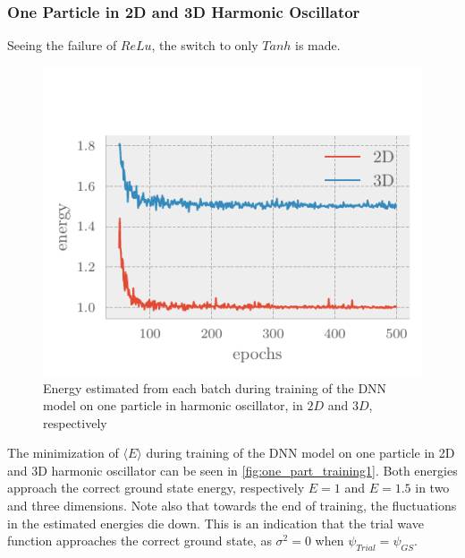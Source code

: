 \subsubsection{One Particle in 2D and 3D Harmonic Oscillator}

Seeing the failure of $ReLu$, the switch to only $Tanh$ is made.

\begin{figure}[H]
	\includegraphics[]{figures/one_part_training2.pdf}
	\caption{Energy estimated from each batch during training of the DNN model on one particle in harmonic oscillator, in $2D$ and $3D$, respectively}
	\label{fig:one_part_training2}
\end{figure}

The minimization of $\langle E \rangle$ during training of the DNN model on one particle in 2D and 3D harmonic oscillator can be seen in \autoref{fig:one_part_training1}. Both energies approach the correct ground state energy, respectively $E=1$ and $E=1.5$ in two and three dimensions. Note also that towards the end of training, the fluctuations in the estimated energies die down. This is an indication that the trial wave function approaches the correct ground state, as $\sigma^2 = 0$ when $\psi_{Trial} = \psi_{GS}$.  


